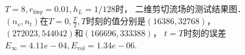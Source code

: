 \begin{figure}[htbp]
	\hfill
	\hfill
	\caption[二维剪切流场测试结果]{$T=8,r_{\mathsf{tiny}}=0.01,h_L=1/128$时，
		二维剪切流场的测试结果图．$(n_v,n_t)$在$T=0, \frac{T}{2}, T$时刻的值分别是$(16386,32768)$，$(272023,544042)$和$(166696,333388)$，
		$t=T$时刻的误差$E_{\infty}=4.11e-04,E_{\mathrm{vol}}=1.34e-06$.}
	\label{fig:vortexT8}
\end{figure}

